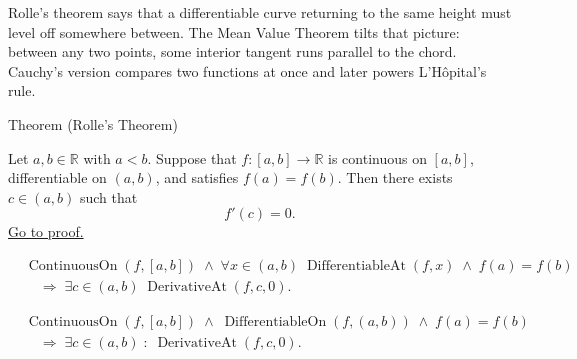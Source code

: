 
\begin{remark*}
Rolle's theorem says that a differentiable curve returning to the same height
must level off somewhere between. The Mean Value Theorem tilts that picture:
between any two points, some interior tangent runs parallel to the chord.
Cauchy's version compares two functions at once and later powers
L'H\^{o}pital's rule.
\end{remark*}



\begin{theorembox}{Theorem (Rolle's Theorem)}
\begin{theorem}
\label{thm:rolles-theorem}
Let $a, b \in \mathbb{R}$ with $a < b$. Suppose that $f : [a,b] \to \mathbb{R}$ is continuous on $[a,b]$, differentiable on $(a,b)$, and satisfies $f(a) = f(b)$. Then there exists $c \in (a,b)$ such that
\[
f'(c) = 0.
\]
\hyperref[prf:rolles-theorem]{Go to proof.}
\end{theorem}
\end{theorembox}

\begin{remark*}
\begin{align*}
&\operatorname{ContinuousOn}(f,[a,b])
\;\land\;
\forall x \in (a,b)\;\operatorname{DifferentiableAt}(f,x)
\;\land\;
f(a)=f(b)\\
&\quad\Rightarrow\;
\exists c \in (a,b)\;\operatorname{DerivativeAt}(f,c,0).
\end{align*}
\end{remark*}

\begin{remark*}
\begin{align*}
&\operatorname{ContinuousOn}(f,[a,b])
\;\land\;
\operatorname{DifferentiableOn}(f,(a,b))
\;\land\;
f(a)=f(b)\\
&\quad\Longrightarrow\;
\exists c\in(a,b)\;:\;\operatorname{DerivativeAt}(f,c,0).
\end{align*}
\end{remark*}

